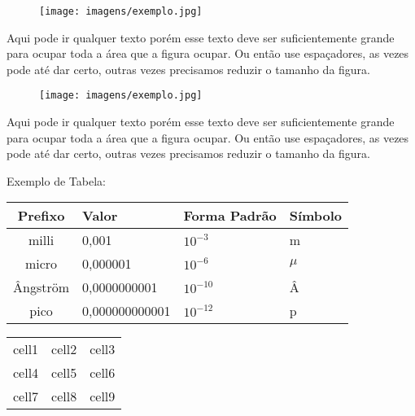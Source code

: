 \documentclass[a4paper,11pt]{article}
\begin{document}
\begin{minipage}{\textwidth}
	\vspace{5pt}
	\begin{wrapfigure}{l}{0.15\textwidth}
		\vspace{-\baselineskip}
		\texttt{[image: imagens/exemplo.jpg]} 
	\end{wrapfigure}
	Aqui pode ir qualquer texto porém esse texto deve ser suficientemente grande para ocupar toda a área que a figura ocupar. Ou então use espaçadores, as vezes pode até dar certo, outras vezes precisamos reduzir o tamanho da figura.
\end{minipage}

\begin{minipage}{\textwidth}
	\vspace{5pt}
	\begin{wrapfigure}{t}{0.15\textwidth}
		\vspace{-\baselineskip}
		\texttt{[image: imagens/exemplo.jpg]} 
	\end{wrapfigure}
	Aqui pode ir qualquer texto porém esse texto deve ser suficientemente grande para ocupar toda a área que a figura ocupar. Ou então use espaçadores, as vezes pode até dar certo, outras vezes precisamos reduzir o tamanho da figura. \\[3mm]
\end{minipage}

Exemplo de Tabela:
\begin{table}[H]
	\centering 
	\begin{tabular}{c | L{3cm} | C{3cm} | R{3cm} }
		\textbf{Prefixo} & \textbf{Valor} & \textbf{Forma Padrão} & \textbf{Símbolo} \\
		\hline
		milli & 0,001 & $10^{-3}$ & m \\
		micro & 0,000001 & $10^{-6}$ & $\mu$ \\
		Ângström & 0,0000000001 & $10^{-10}$ & Â \\
		pico & 0,000000000001 & $10^{-12}$ & p \\
	\end{tabular}
\end{table}

\begin{center}
	\begin{tabular}{ c|c|c } 
		\hline
		cell1 & cell2 & cell3 \\ 
		cell4 & cell5 & cell6 \\ 
		cell7 & cell8 & cell9 \\ 
		\hline
	\end{tabular}
\end{center}
\end{document}
